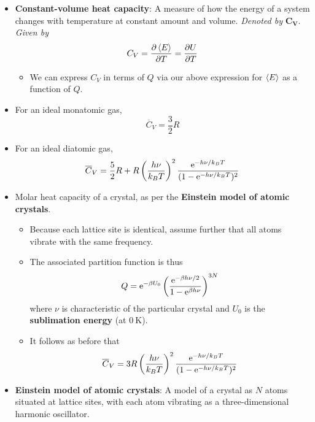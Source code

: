 \documentclass[../notes.tex]{subfiles}
\begin{document}
\begin{itemize}
\begin{itemize}
    \end{itemize}
    \item \textbf{Constant-volume heat capacity}: A measure of how the energy of a system changes with temperature at constant amount and volume. \emph{Denoted by} $\bm{C_V}$. \emph{Given by}
    \begin{equation*}
        C_V = \pdv{\prb{E}}{T} = \pdv{U}{T}
    \end{equation*}
    \begin{itemize}
        \item We can express $C_V$ in terms of $Q$ via our above expression for $\prb{E}$ as a function of $Q$.
    \end{itemize}
    \item For an ideal monatomic gas,
    \begin{equation*}
        \overline{C}_V = \frac{3}{2}R
    \end{equation*}
    \item For an ideal diatomic gas,
    \begin{equation*}
        \overline{C}_V = \frac{5}{2}R+R\left( \frac{h\nu}{k_BT} \right)^2\frac{\e[-h\nu/k_BT]}{(1-\e[-h\nu/k_BT])^2}
    \end{equation*}
    \item Molar heat capacity of a crystal, as per the \textbf{Einstein model of atomic crystals}.
    \begin{itemize}
        \item Because each lattice site is identical, assume further that all atoms vibrate with the same frequency.
        \item The associated partition function is thus
        \begin{equation*}
            Q = \e[-\beta U_0]\left( \frac{\e[-\beta h\nu/2]}{1-\e[\beta h\nu]} \right)^{3N}
        \end{equation*}
        where $\nu$ is characteristic of the particular crystal and $U_0$ is the \textbf{sublimation energy} (at $\SI{0}{\kelvin}$).
        \item It follows as before that
        \begin{equation*}
            \overline{C}_V = 3R\left( \frac{h\nu}{k_BT} \right)^2\frac{\e[-h\nu/k_BT]}{(1-\e[-h\nu/k_BT])^2}
        \end{equation*}
    \end{itemize}
    \item \textbf{Einstein model of atomic crystals}: A model of a crystal as $N$ atoms situated at lattice sites, with each atom vibrating as a three-dimensional harmonic oscillator.

\end{itemize}
\end{document}
